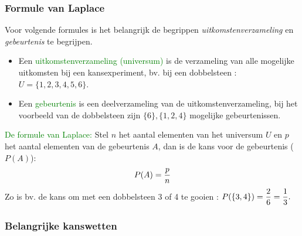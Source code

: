 \hypertarget{laplace}{}
\subsubsection{Formule van Laplace} \label{laplace}

Voor volgende formules is het belangrijk de begrippen {\it uitkomstenverzameling} en {\it gebeurtenis} te begrijpen.
\begin{itemize}
\item Een \textcolor{green}{uitkomstenverzameling (universum)} is de verzameling van alle mogelijke uitkomsten bij een kansexperiment, bv. bij een dobbelsteen : $U =\{1, 2, 3, 4, 5, 6\}$.
\item Een \textcolor{green}{gebeurtenis} is een deelverzameling van de uitkomstenverzameling, bij het voorbeeld van de dobbelsteen zijn $\{6\}, \{1, 2, 4\}$ mogelijke gebeurtenissen.
\end{itemize}
\textcolor{green}{De formule van Laplace:}\newline
Stel $n$ het aantal elementen van het universum $U$ en $p$ het aantal elementen van de gebeurtenis $A$, dan is de kans voor de gebeurtenis ($P(A)$):\newline\newline
\[P(A)=\displaystyle \frac{\displaystyle p}{\displaystyle n}\]\newline
Zo is bv. de kans om met een dobbelsteen 3 of 4 te gooien : $P(\{3,4\})= \displaystyle{ \frac{\displaystyle2}{\displaystyle6}=\frac{\displaystyle1}{\displaystyle3}}.$\newline\newline\newline

\hypertarget{kanswetten}{}
\subsubsection{Belangrijke kanswetten} \label{kanswetten}

